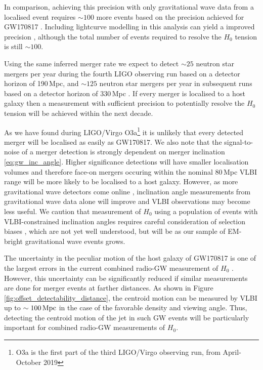 In comparison, achieving this precision with only gravitational wave data from a localised event requires $\sim 100$ more events based on the precision achieved for GW170817 \citep{2017Natur.551...85A}. Including lightcurve modelling in this analysis can yield a improved precision \citep[e.g.][]{2017ApJ...851L..36G,2020ApJ...892L..16D,2020ApJ...888...67D}, although the total number of events required to resolve the $H_0$ tension is still $\sim 100$.

Using the same inferred merger rate we expect to detect $\sim 25$ neutron star mergers per year during the fourth LIGO observing run based on a detector horizon of 190\,Mpc, and $\sim 125$ neutron star mergers per year in subsequent runs based on a detector horizon of 330\,Mpc \citep{2018LRR....21....3A}. If every merger is localised to a host galaxy then a measurement with sufficient precision to potentially resolve the $H_0$ tension will be achieved within the next decade.

As we have found during LIGO/Virgo O3a\footnote{O3a is the first part of the third LIGO/Virgo observing run, from April-October 2019} it is unlikely that every detected merger will be localised as easily as GW170817. We also note that the signal-to-noise of a merger detection is strongly dependent on merger inclination \eqref{eq:gw_inc_angle}. Higher significance detections will have smaller localisation volumes and therefore face-on mergers occuring within the nominal 80\,Mpc VLBI range will be more likely to be localised to a host galaxy. However, as more gravitational wave detectors come online \citep{2018LRR....21....3A}, inclination angle measurements from gravitational wave data alone will improve and VLBI observations may become less useful. We caution that measurement of $H_0$ using a population of events with VLBI-constrained inclination angles requires careful consideration of selection biases \citep{2019PhRvD.100j3523M}, which are not yet well understood, but will be as our sample of EM-bright gravitational wave events grows.

The uncertainty in the peculiar motion of the host galaxy of GW170817 is one of the largest errors in the current combined radio-GW  measurement of $H_0$ \citep{2019NatAs...3..940H,2019arXiv190908627M,2020MNRAS.492.3803H}. However, this uncertainty can be significantly reduced if similar measurements are done for merger events at farther distances. As shown in Figure \ref{fig:offset_detectability_distance}, the centroid motion can be measured by VLBI up to $\sim 100\,{\rm Mpc}$ in the case of the favorable density and viewing angle. Thus, detecting the centroid motion of the jet in such GW events will be particularly  important for combined radio-GW  measurements of $H_0$.

